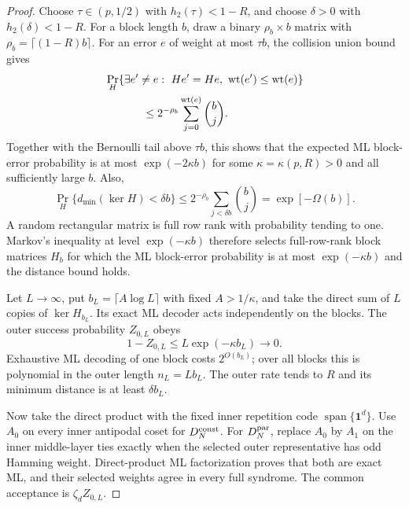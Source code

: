 \documentclass[journal]{IEEEtran}
\theoremstyle{definition}
\theoremstyle{remark}
\newcommand{\ind}{\mathbf 1}
\newcommand{\wt}{\operatorname{wt}}
\begin{document}
\begin{proof}
Choose $\tau\in(p,1/2)$ with $h_2(\tau)<1-R$, and choose
$\delta>0$ with $h_2(\delta)<1-R$.  For a block length $b$, draw a binary
$\rho_b\times b$ matrix with
$\rho_b=\lceil(1-R)b\rceil$.  For an error $e$ of weight at most $\tau b$,
the collision union bound gives
\begin{equation}
 \begin{aligned}
 &\Pr_H\{\exists e'\ne e:\ He'=He,\ \wt(e')\le\wt(e)\}\\
 &\hspace{12mm}\le 2^{-\rho_b}\sum_{j=0}^{\wt(e)}\binom bj.
 \end{aligned}
 \label{eq:log-block-collision}
\end{equation}
Together with the Bernoulli tail above $\tau b$, this shows that the expected
ML block-error probability is at most $\exp(-2\kappa b)$ for some
$\kappa=\kappa(p,R)>0$ and all sufficiently large $b$.  Also,
\begin{equation}
 \Pr_H\{d_{\min}(\ker H)<\delta b\}
 \le 2^{-\rho_b}\sum_{j<\delta b}\binom bj=\exp[-\Omega(b)].
 \label{eq:log-block-distance}
\end{equation}
A random rectangular matrix is full row rank with probability tending to one.
Markov's inequality at level $\exp(-\kappa b)$ therefore selects full-row-rank
block matrices $H_b$ for which the ML block-error probability is at most
$\exp(-\kappa b)$ and the distance bound holds.

Let $L\to\infty$, put $b_L=\lceil A\log L\rceil$ with fixed
$A>1/\kappa$, and take the direct sum of $L$ copies of $\ker H_{b_L}$.
Its exact ML decoder acts independently on the blocks.  The outer success
probability $Z_{0,L}$ obeys
\begin{equation}
 1-Z_{0,L}\le L\exp(-\kappa b_L)\longrightarrow0.
 \label{eq:log-block-success}
\end{equation}
Exhaustive ML decoding of one block costs $2^{O(b_L)}$; over all blocks this is
polynomial in the outer length $n_L=Lb_L$.  The outer rate tends to $R$ and
its minimum distance is at least $\delta b_L$.

Now take the direct product with the fixed inner repetition code
$\operatorname{span}\{\ind^d\}$.  Use $A_0$ on every inner antipodal coset for
$D_N^{\rm const}$.  For $D_N^{\rm par}$, replace $A_0$ by $A_1$ on the inner
middle-layer ties exactly when the selected outer representative has odd
Hamming weight.  Direct-product ML factorization proves that both are exact ML,
and their selected weights agree in every full syndrome.  The common
acceptance is $\zeta_d Z_{0,L}$.


\end{proof}
\end{document}
